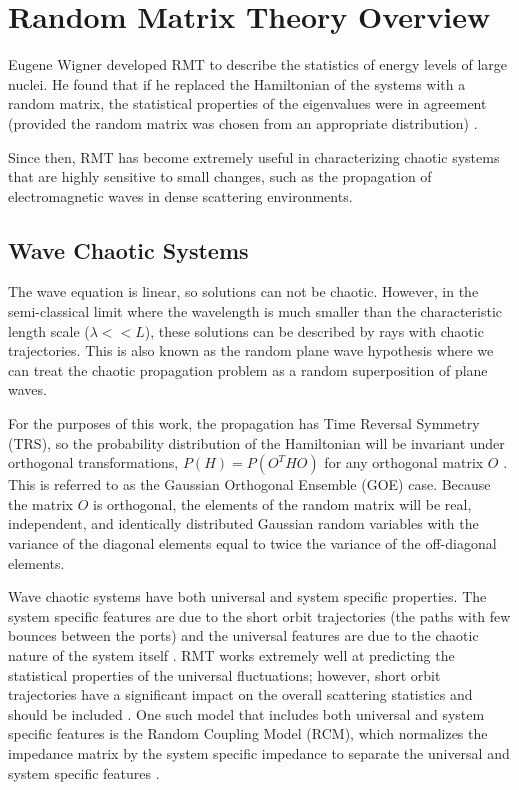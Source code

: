 \renewcommand{\baselinestretch}{2} \small\normalsize
\section{Random Matrix Theory Overview}
Eugene Wigner developed RMT to describe the statistics of energy levels of large nuclei. He found that if he replaced the Hamiltonian of the systems with a random matrix, the statistical properties of the eigenvalues were in agreement (provided the random matrix was chosen from an appropriate distribution) \cite{ott_chaos}.

Since then, RMT has become extremely useful in characterizing chaotic systems that are highly sensitive to small changes, such as the propagation of electromagnetic waves in dense scattering environments.

\subsection{Wave Chaotic Systems}
The wave equation is linear, so solutions can not be chaotic. However, in the semi-classical limit where the wavelength is much smaller than the characteristic length scale ($\lambda << L$), these solutions can be described by rays with chaotic trajectories. This is also known as the random plane wave hypothesis where we can treat the chaotic propagation problem as a random superposition of plane waves.

For the purposes of this work, the propagation has Time Reversal Symmetry (TRS), so the probability distribution of the Hamiltonian will be invariant under orthogonal transformations, $P(H) = P(O^THO)$ for any orthogonal matrix $O$ \cite{ott_chaos}. This is referred to as the Gaussian Orthogonal Ensemble (GOE) case. Because the matrix $O$ is orthogonal, the elements of the random matrix will be real, independent, and identically distributed Gaussian random variables with the variance of the diagonal elements equal to twice the variance of the off-diagonal elements.

Wave chaotic systems have both universal and system specific properties. The system specific features are due to the short orbit trajectories (the paths with few bounces between the ports) and the universal features are due to the chaotic nature of the system itself \cite{bohigas}. RMT works extremely well at predicting the statistical properties of the universal fluctuations; however, short orbit trajectories have a significant impact on the overall scattering statistics and should be included \cite{hart_so} \cite{yeh_universal}. One such model that includes both universal and system specific features is the Random Coupling Model (RCM), which normalizes the impedance matrix by the system specific impedance to separate the universal and system specific features  \cite{zheng_single} \cite{zheng_multiple} \cite{hemmady_review} \cite{gradoni_review}.

